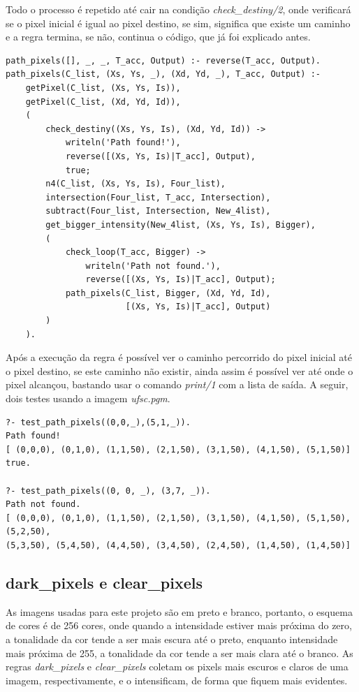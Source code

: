 \documentclass{article}
\begin{document}
        Todo o processo é repetido até cair na condição \textit{check\_destiny/2}, onde verificará se o pixel inicial é igual ao pixel destino, se sim, significa que existe um caminho e a regra termina, se não, continua o código, que já foi explicado antes.
        \begin{lstlisting}[frame=single]
path_pixels([], _, _, T_acc, Output) :- reverse(T_acc, Output).
path_pixels(C_list, (Xs, Ys, _), (Xd, Yd, _), T_acc, Output) :-
    getPixel(C_list, (Xs, Ys, Is)),
    getPixel(C_list, (Xd, Yd, Id)),
    (
        check_destiny((Xs, Ys, Is), (Xd, Yd, Id)) ->
            writeln('Path found!'),
            reverse([(Xs, Ys, Is)|T_acc], Output),
            true;
        n4(C_list, (Xs, Ys, Is), Four_list),
        intersection(Four_list, T_acc, Intersection),
        subtract(Four_list, Intersection, New_4list),
        get_bigger_intensity(New_4list, (Xs, Ys, Is), Bigger),
        (
            check_loop(T_acc, Bigger) ->
                writeln('Path not found.'),
                reverse([(Xs, Ys, Is)|T_acc], Output);
            path_pixels(C_list, Bigger, (Xd, Yd, Id), 
                        [(Xs, Ys, Is)|T_acc], Output)
        )
    ).
        \end{lstlisting}
        
        Após a execução da regra é possível ver o caminho percorrido do pixel inicial até o pixel destino, se este caminho não existir, ainda assim é possível ver até onde o pixel alcançou, bastando usar o comando \textit{print/1} com a lista de saída. A seguir, dois testes usando a imagem \textit{ufsc.pgm}.

        \begin{verbatim}
?- test_path_pixels((0,0,_),(5,1,_)).
Path found!
[ (0,0,0), (0,1,0), (1,1,50), (2,1,50), (3,1,50), (4,1,50), (5,1,50)]
true.

?- test_path_pixels((0, 0, _), (3,7, _)).
Path not found.
[ (0,0,0), (0,1,0), (1,1,50), (2,1,50), (3,1,50), (4,1,50), (5,1,50), (5,2,50),
(5,3,50), (5,4,50), (4,4,50), (3,4,50), (2,4,50), (1,4,50), (1,4,50)]
    \end{verbatim}

    \newpage
    \subsection*{dark\_pixels e clear\_pixels}
        As imagens usadas para este projeto são em preto e branco, portanto, o esquema de cores é de 256 cores, onde quando a intensidade estiver mais próxima do zero, a tonalidade da cor tende a ser mais escura até o preto, enquanto intensidade mais próxima de 255, a tonalidade da cor tende a ser mais clara até o branco. As regras \textit{dark\_pixels} e \textit{clear\_pixels} coletam os pixels mais escuros e claros de uma imagem, respectivamente, e o intensificam, de forma que fiquem mais evidentes.
        
\end{document}
